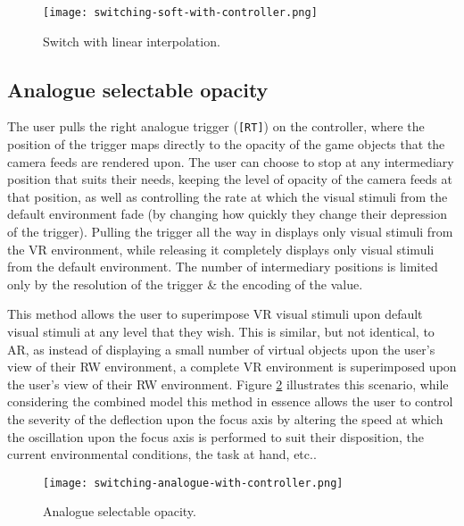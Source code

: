 \begin{figure}[h]
	\begin{center}
		\texttt{[image: switching-soft-with-controller.png]}
		\caption{Switch with linear interpolation.}
		\label{scenario12}
	\end{center}
\end{figure}


\subsection{Analogue selectable opacity}
The user pulls the right analogue trigger (\texttt{[RT]}) on the controller, where the position of the trigger maps directly to the opacity of the game objects that the camera feeds are rendered upon. The user can choose to stop at any intermediary position that suits their needs, keeping the level of opacity of the camera feeds at that position, as well as controlling the rate at which the visual stimuli from the default environment fade (by changing how quickly they change their depression of the trigger). Pulling the trigger all the way in displays only visual stimuli from the VR environment, while releasing it completely displays only visual stimuli from the default environment. The number of intermediary positions is limited only by the resolution of the trigger \& the encoding of the value.

This method allows the user to superimpose VR visual stimuli upon default visual stimuli at any level that they wish. This is similar, but not identical, to AR, as instead of displaying a small number of virtual objects upon the user's view of their RW environment, a complete VR environment is superimposed upon the user's view of their RW environment. Figure \ref{scenario2} illustrates this scenario, while considering the combined model this method in essence allows the user to control the severity of the deflection upon the focus axis by altering the speed at which the oscillation upon the focus axis is performed to suit their disposition, the current environmental conditions, the task at hand, etc..

\begin{figure}[h]
	\begin{center}
		\texttt{[image: switching-analogue-with-controller.png]}
		\caption{Analogue selectable opacity.}
		\label{scenario2}
	\end{center}
\end{figure}


